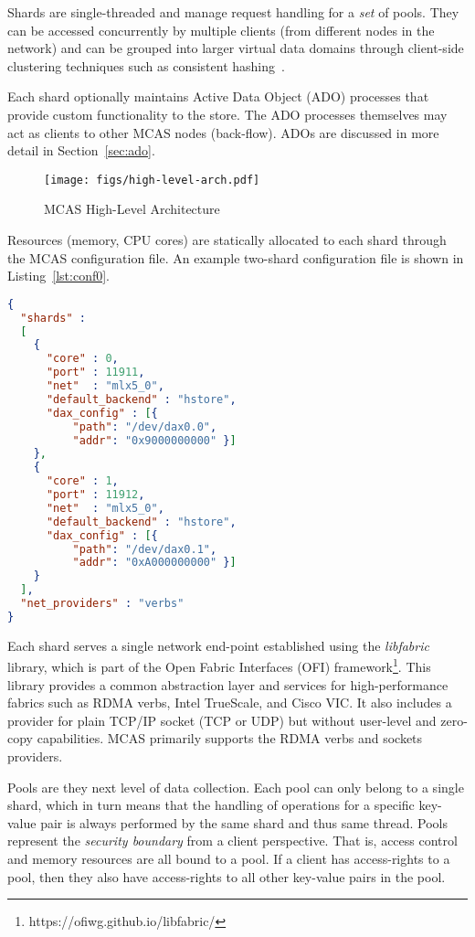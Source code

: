 \documentclass[letterpaper,twocolumn,10pt]{article}
\begin{document}
Shards are single-threaded and manage request handling for a
\textit{set} of pools.  They can be accessed concurrently by multiple
clients (from different nodes in the network) and can be
grouped into larger virtual data domains through client-side
clustering techniques such as consistent
hashing~\cite{TanenbaumSteen07}.

Each shard optionally maintains Active Data Object (ADO) processes
that provide custom functionality to the store.  The ADO processes
themselves may act as clients to other MCAS nodes (back-flow).  ADOs
are discussed in more detail in Section~\ref{sec:ado}.

\begin{figure}
\centering
\texttt{[image: figs/high-level-arch.pdf]}
\caption{MCAS High-Level Architecture}
\label{fig:hl_arch}
\end{figure}

Resources (memory, CPU cores) are statically allocated to
each shard through the MCAS configuration file. An example two-shard
configuration file is shown in Listing~\ref{lst:conf0}.

\begin{minipage}{\linewidth}
\begin{lstlisting}[language=json,
    caption={Example MCAS two-shard configuration},
    captionpos=b, label={lst:conf0}]
{
  "shards" :
  [
    {
      "core" : 0,
      "port" : 11911,
      "net"  : "mlx5_0",
      "default_backend" : "hstore",
      "dax_config" : [{
          "path": "/dev/dax0.0",
          "addr": "0x9000000000" }]
    },
    {
      "core" : 1,
      "port" : 11912,
      "net"  : "mlx5_0",
      "default_backend" : "hstore",
      "dax_config" : [{
          "path": "/dev/dax0.1",
          "addr": "0xA000000000" }]
    }
  ],
  "net_providers" : "verbs"
}
\end{lstlisting}
\end{minipage}

Each shard serves a single network end-point established using the
\textit{libfabric} library, which is part of the Open Fabric
Interfaces (OFI)
framework\footnote{https://ofiwg.github.io/libfabric/}.  This library
provides a common abstraction layer and services for high-performance
fabrics such as RDMA verbs, Intel TrueScale, and Cisco VIC.  It also
includes a provider for plain TCP/IP socket (TCP or UDP) but without
user-level and zero-copy capabilities.  MCAS primarily supports the
RDMA verbs and sockets providers.

Pools are they next level of data collection.  Each pool can only
belong to a single shard, which in turn means that the handling of
operations for a specific key-value pair is always performed by the
same shard and thus same thread.  Pools represent the \textit{security
  boundary} from a client perspective.  That is, access control and
memory resources are all bound to a pool.  If a client has
access-rights to a pool, then they also have access-rights to all
other key-value pairs in the pool.  
\end{document}
